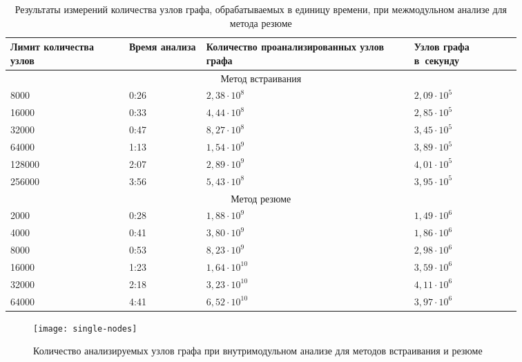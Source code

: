 \begin{table}
\renewcommand{\arraystretch}{1.2}
\begin{tabular}{| p{0.2\linewidth} | p{0.13\linewidth} | p{0.35\linewidth} | p{0.18\linewidth} |} 
\hline
Лимит количества узлов & Время анализа & Количество проанализированных узлов графа & Узлов графа в~секунду \\
\hline
\multicolumn{4}{|c|}{Метод встраивания} \\
\hline
\hline
8000      &   0:26       & $2,38 \cdot 10^8$  & $2,09 \cdot 10^5$ \\
\hline
16000     &  0:33        & $4,44 \cdot 10^8$  & $2,85 \cdot 10^5$ \\
\hline
32000     &  0:47        & $8,27 \cdot 10^8$  & $3,45 \cdot 10^5$ \\
\hline
64000     &  1:13        & $1,54 \cdot 10^9$  & $3,89 \cdot 10^5$ \\
\hline
128000    &   2:07       & $2,89 \cdot 10^9$  & $4,01 \cdot 10^5$ \\
\hline
256000    &   3:56       & $5,43 \cdot 10^8$  & $3,95 \cdot 10^5$ \\
\hline
\hline
\multicolumn{4}{|c|}{Метод резюме} \\
\hline
\hline
2000      &   0:28       & $1,88 \cdot 10^9$  & $1,49 \cdot 10^6$ \\
\hline
4000      &   0:41       & $3,80 \cdot 10^9$  & $1,86 \cdot 10^6$ \\
\hline
8000      &   0:53       & $8,23 \cdot 10^9$  & $2,98 \cdot 10^6$ \\
\hline
16000     &  1:23        & $1,64 \cdot 10^{10}$  & $3,59 \cdot 10^6$ \\
\hline
32000     &  2:18        & $3,23 \cdot 10^{10}$  & $4,11 \cdot 10^6$ \\
\hline
64000     &  4:41        & $6,52 \cdot 10^{10}$ & $3,97 \cdot 10^6$ \\
\hline
\hline

\end{tabular}
\caption{Результаты измерений количества узлов графа, обрабатываемых в единицу времени, при межмодульном анализе для метода резюме} \label{table:time-nodes-xtu}

\end{table}


\begin{figure}[h]
   \centering
   \texttt{[image: single-nodes]}
   \caption{Количество анализируемых узлов графа при внутримодульном анализе для методов встраивания и резюме}\label{pic:single-nodes}
\end{figure}

